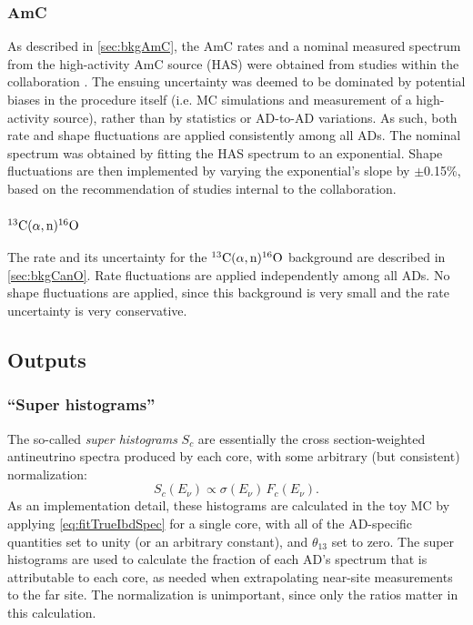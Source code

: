\documentclass[../thesis.tex]{subfiles}
\begin{document}
\subsubsection{AmC}

As described in \autoref{sec:bkgAmC}, the AmC rates and a nominal measured spectrum from the high-activity AmC source (HAS) were obtained from studies within the collaboration \cite{AmC_paper}. The ensuing uncertainty was deemed to be dominated by potential biases in the procedure itself (i.e. MC simulations and measurement of a high-activity source), rather than by statistics or AD-to-AD variations. As such, both rate and shape fluctuations are applied consistently among all ADs. The nominal spectrum was obtained by fitting the HAS spectrum to an exponential. Shape fluctuations are then implemented by varying the exponential's slope by $\pm$0.15\%, based on the recommendation of studies internal to the collaboration.

\subsubsection{$^{13}\mathrm{C}(\alpha, \mathrm{n})^{16}\mathrm{O}$}

The rate and its uncertainty for the $^{13}\mathrm{C}(\alpha, \mathrm{n})^{16}\mathrm{O}$ background are described in \autoref{sec:bkgCanO}. Rate fluctuations are applied independently among all ADs. No shape fluctuations are applied, since this background is very small and the rate uncertainty is very conservative.

\subsection{Outputs}
\label{sec:fitToyOutputs}

\subsubsection{``Super histograms''}

The so-called \emph{super histograms} $S_c$ are essentially the cross section-weighted antineutrino spectra produced by each core, with some arbitrary (but consistent) normalization:
\begin{equation*}
  S_c(E_\nu) \propto \sigma(E_\nu)\,F_c(E_\nu).
\end{equation*}
As an implementation detail, these histograms are calculated in the toy MC by applying \autoref{eq:fitTrueIbdSpec} for a single core, with all of the AD-specific quantities set to unity (or an arbitrary constant), and $\theta_{13}$ set to zero. The super histograms are used to calculate the fraction of each AD's spectrum that is attributable to each core, as needed when extrapolating near-site measurements to the far site. The normalization is unimportant, since only the ratios matter in this calculation.
\end{document}
